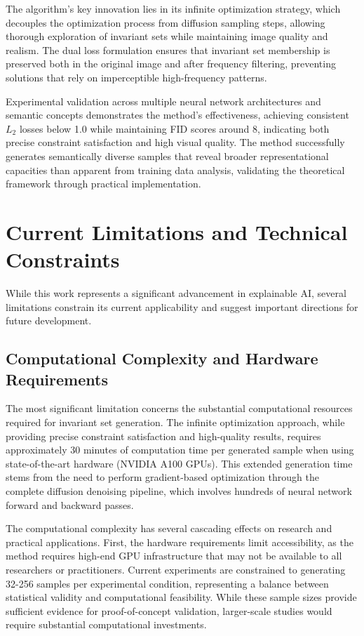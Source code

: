 The algorithm's key innovation lies in its infinite optimization strategy, which decouples the optimization process from diffusion sampling steps, allowing thorough exploration of invariant sets while maintaining image quality and realism. The dual loss formulation ensures that invariant set membership is preserved both in the original image and after frequency filtering, preventing solutions that rely on imperceptible high-frequency patterns.

Experimental validation across multiple neural network architectures and semantic concepts demonstrates the method's effectiveness, achieving consistent $L_2$ losses below 1.0 while maintaining FID scores around 8, indicating both precise constraint satisfaction and high visual quality. The method successfully generates semantically diverse samples that reveal broader representational capacities than apparent from training data analysis, validating the theoretical framework through practical implementation.

\section{Current Limitations and Technical Constraints}

While this work represents a significant advancement in explainable AI, several limitations constrain its current applicability and suggest important directions for future development.

\subsection{Computational Complexity and Hardware Requirements}

The most significant limitation concerns the substantial computational resources required for invariant set generation. The infinite optimization approach, while providing precise constraint satisfaction and high-quality results, requires approximately 30 minutes of computation time per generated sample when using state-of-the-art hardware (NVIDIA A100 GPUs). This extended generation time stems from the need to perform gradient-based optimization through the complete diffusion denoising pipeline, which involves hundreds of neural network forward and backward passes.

The computational complexity has several cascading effects on research and practical applications. First, the hardware requirements limit accessibility, as the method requires high-end GPU infrastructure that may not be available to all researchers or practitioners. Current experiments are constrained to generating 32-256 samples per experimental condition, representing a balance between statistical validity and computational feasibility. While these sample sizes provide sufficient evidence for proof-of-concept validation, larger-scale studies would require substantial computational investments.

